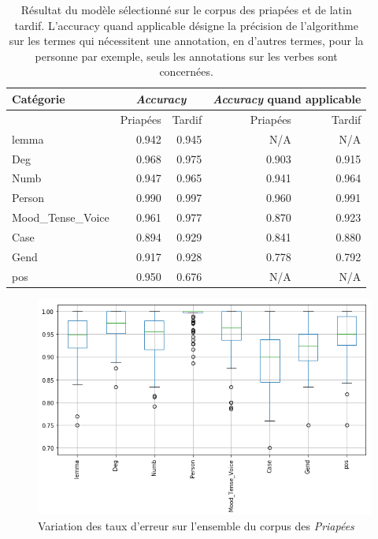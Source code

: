 \begin{table}[h]
    \centering
    \begin{tabular}{l|rr|rr}
    \toprule
         Catégorie &  \multicolumn{2}{c}{\textit{Accuracy}} & \multicolumn{2}{c}{\textit{Accuracy} quand applicable} \\
    \midrule    
                {} &  Priapées &    Tardif                  & Priapées &    Tardif                                   \\
    \midrule
             lemma &     0.942 &    0.945                   &   N/A    &    N/A                                      \\
               Deg &     0.968 &    0.975                   &   0.903  &    0.915                                    \\
              Numb &     0.947 &    0.965                   &   0.941  &    0.964                                    \\
            Person &     0.990 &    0.997                   &   0.960  &    0.991                                    \\
Mood\_Tense\_Voice &     0.961 &    0.977                   &   0.870  &    0.923                                    \\
              Case &     0.894 &    0.929                   &   0.841  &    0.880                                    \\
              Gend &     0.917 &    0.928                   &   0.778  &    0.792                                    \\
               pos &     0.950 &    0.676                   &   N/A    &    N/A                                      \\
    \bottomrule
    \end{tabular}
    \caption{Résultat du modèle sélectionné sur le corpus des priapées et de latin tardif. L'accuracy quand applicable désigne la précision de l'algorithme sur les termes qui nécessitent une annotation, en d'autres termes, pour la personne par exemple, seuls les annotations sur les verbes sont concernées.}
    \label{tab:out_of_domain_global_accuracy}
\end{table}


\begin{figure}[ht]
    \centering
    \includegraphics[width=0.7\linewidth]{results/lemmatisation/extensibilite/PriapeaBoxPlot.png}
    \caption{Variation des taux d'erreur sur l'ensemble du corpus des \textit{Priapées}}
    \label{fig:priapea_varations_boxplot}
\end{figure}

